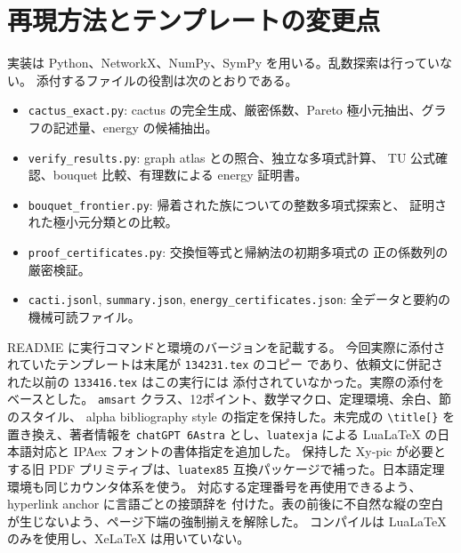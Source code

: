 \documentclass[12pt]{amsart}
\theoremstyle{definition}
\theoremstyle{remark}
\numberwithin{equation}{section}
\renewcommand{\theHsection}{en.\arabic{section}}
\begin{document}
\section{再現方法とテンプレートの変更点}
実装は Python、NetworkX、NumPy、SymPy を用いる。乱数探索は行っていない。
添付するファイルの役割は次のとおりである。
\begin{itemize}
\item \texttt{cactus\_exact.py}: cactus の完全生成、厳密係数、Pareto
極小元抽出、グラフの記述量、energy の候補抽出。
\item \texttt{verify\_results.py}: graph atlas との照合、独立な多項式計算、
TU 公式確認、bouquet 比較、有理数による energy 証明書。
\item \texttt{bouquet\_frontier.py}: 帰着された族についての整数多項式探索と、
証明された極小元分類との比較。
\item \texttt{proof\_certificates.py}: 交換恒等式と帰納法の初期多項式の
正の係数列の厳密検証。
\item \texttt{cacti.jsonl}, \texttt{summary.json},
\texttt{energy\_certificates.json}: 全データと要約の機械可読ファイル。
\end{itemize}
README に実行コマンドと環境のバージョンを記載する。
今回実際に添付されていたテンプレートは末尾が \texttt{134231.tex} のコピー
であり、依頼文に併記された以前の \texttt{133416.tex} はこの実行には
添付されていなかった。実際の添付をベースとした。
\texttt{amsart} クラス、12ポイント、数学マクロ、定理環境、余白、節のスタイル、
alpha bibliography style の指定を保持した。未完成の \verb|\title[}| を
置き換え、著者情報を \texttt{chatGPT 6Astra} とし、\texttt{luatexja} による
LuaLaTeX の日本語対応と IPAex フォントの書体指定を追加した。
保持した Xy-pic が必要とする旧 PDF プリミティブは、\texttt{luatex85}
互換パッケージで補った。日本語定理環境も同じカウンタ体系を使う。
対応する定理番号を再使用できるよう、hyperlink anchor に言語ごとの接頭辞を
付けた。表の前後に不自然な縦の空白が生じないよう、ページ下端の強制揃えを解除した。
コンパイルは LuaLaTeX のみを使用し、XeLaTeX は用いていない。

\appendix
\renewcommand{\theHsection}{ja.appendix.\Alph{section}}
\end{document}
